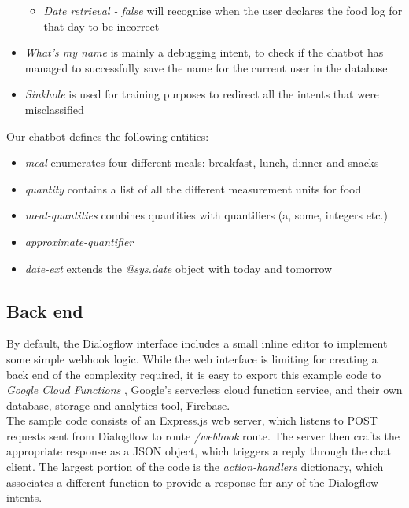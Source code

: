 \begin{itemize}
  \begin{itemize}
        \item \textit{Date retrieval - false} will recognise when the user declares the food log for that day to be incorrect
  \end{itemize}
  \item \textit{What's my name} is mainly a debugging intent, to check if the chatbot has managed to successfully save the name for the current user in the database
  \item \textit{Sinkhole} is used for training purposes to redirect all the intents that were misclassified
\end{itemize}
Our chatbot defines the following entities:
\begin{itemize}
  \item \textit{meal} enumerates four different meals: breakfast, lunch, dinner and snacks
  \item \textit{quantity} contains a list of all the different measurement units for food
  \item \textit{meal-quantities} combines quantities with quantifiers (a, some, integers etc.)
  \item \textit{approximate-quantifier}
  \item \textit{date-ext} extends the \textit{@sys.date} object with today and tomorrow
\end{itemize}

\subsection{Back end}
By default, the Dialogflow interface includes a small inline editor to implement some simple webhook logic. While the web interface is limiting for creating a back end of the complexity required, it is easy to export this example code to \textit{Google Cloud Functions} \cite{gcfwebsite}, Google's serverless cloud function service, and their own database, storage and analytics tool, Firebase. \\
The sample code consists of an Express.js \cite{expresswebsite} web server, which listens to POST requests sent from Dialogflow to route \textit{/webhook} route. The server then crafts the appropriate response as a JSON object, which triggers a reply through the chat client. The largest portion of the code is the \textit{action-handlers} dictionary, which associates a different function to provide a response for any of the Dialogflow intents. 

